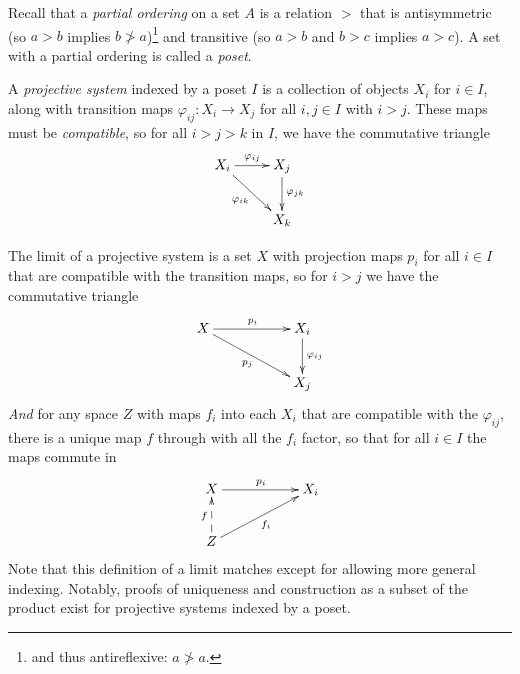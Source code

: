       Recall that a \emph{partial ordering} on a set $A$ is a relation $>$ that is antisymmetric (so $a>b$ implies $b\not>a$)\footnote{and thus antireflexive: $a\not>a$.} and transitive (so $a>b$ and $b>c$ implies $a>c$).
      A set with a partial ordering is called a \emph{poset}.

      A \emph{projective system} indexed by a poset $I$ is a collection of objects $X_i$ for $i\in I$, along with transition maps $\varphi_{ij}:X_i\rightarrow X_j$ for all $i,j\in I$ with $i>j$.
      These maps must be \emph{compatible}, so for all $i>j>k$ in $I$, we have the commutative triangle
      \begin{displaymath}
        \xymatrix{
          X_i \ar[r]^{\varphi_{ij}} \ar[dr]_{\varphi_{ik}} & X_j \ar[d]^{\varphi_{jk}} \\
          & X_k
        }
      \end{displaymath}

      The limit of a projective system is a set $X$ with projection maps $p_i$ for all $i\in I$ that are compatible with the transition maps, so for $i>j$ we have the commutative triangle
      \begin{displaymath}
        \xymatrix{
          X \ar[rr]^{p_i} \ar[drr]_{p_j} && X_i \ar[d]^{\varphi_{ij}} \\
          && X_j
        }
      \end{displaymath}
      \emph{And} for any space $Z$ with maps $f_i$ into each $X_i$ that are compatible with the $\varphi_{ij}$, there is a unique map $f$ through with all the $f_i$ factor, so that for all $i\in I$ the maps commute in
      \begin{displaymath}
        \xymatrix{
          X \ar[rr]^{p_i} && X_i  \\
          Z \ar@{-->}[u]^f \ar[urr]_{f_i} 
        }
      \end{displaymath}
      Note that this definition of a limit matches  except for allowing more general indexing.
      Notably, proofs of uniqueness and construction as a subset of the product exist for projective systems indexed by a poset.
      
